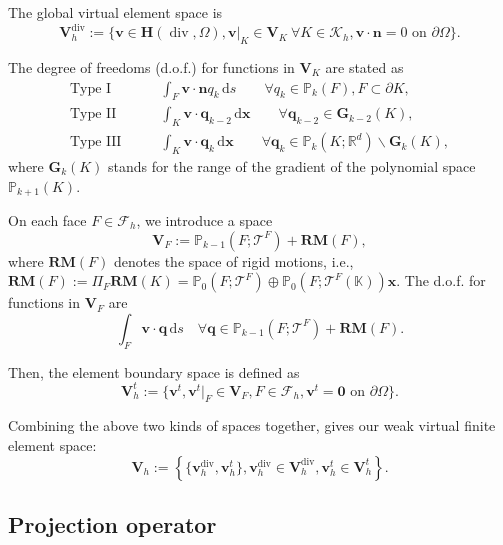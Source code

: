 \documentclass[review,hidelinks,onefignum,onetabnum]{siamart251216}
\begin{document}
The global virtual element space is
\begin{equation*}
\boldsymbol{V}_h^{\operatorname{div}} := \{ \boldsymbol{v} \in \boldsymbol{H}(\operatorname{div}, \Omega), \boldsymbol{v}|_K \in \boldsymbol{V}_K \ \forall K \in \mathcal{K}_h, \boldsymbol{v} \cdot \boldsymbol{n} = 0 \text{ on } \partial \Omega \} .
\end{equation*}


The degree of freedoms (d.o.f.) for functions in \(\boldsymbol{V}_K\) are stated as
\begin{align*}
\text{Type I} \qquad & \int_F \boldsymbol{v} \cdot \boldsymbol{n} q_k \, \mathrm{d}s \qquad \forall q_k \in \mathbb{P}_k(F), F \subset \partial K, \\
\text{Type II} \qquad & \int_K \boldsymbol{v} \cdot \boldsymbol{q}_{k-2} \, \mathrm{d}\boldsymbol{x} \qquad \forall \boldsymbol{q}_{k-2} \in \mathbf{G}_{k-2}(K), \\
\text{Type III} \qquad & \int_K \boldsymbol{v} \cdot \boldsymbol{q}_k \, \mathrm{d}\boldsymbol{x} \qquad \forall \boldsymbol{q}_k \in \mathbb{P}_k(K;\mathbb{R}^d) \backslash \mathbf{G}_k(K),
\end{align*}
where \(\mathbf{G}_k(K)\) stands for the range of the gradient of the polynomial space \(\mathbb{P}_{k+1}(K)\).

On each face \(F \in \mathcal{F}_h\), we introduce a space 
$$
\boldsymbol{V}_F := \mathbb{P}_{k-1}(F;\mathscr T^F) + \mathbf{RM}(F),
$$
 where \(\mathbf{RM}(F)\) denotes the space of rigid motions, i.e., \(\mathbf{RM}(F) :=\Pi_F \mathbf{RM}(K)= \mathbb{P}_0(F; \mathscr T^F) \oplus \mathbb{P}_0(F; \mathscr T^F(\mathbb K)) \boldsymbol{x}\). The d.o.f. for functions in \(\boldsymbol{V}_F\) are
\[
\int_F \boldsymbol{v} \cdot \boldsymbol{q} \, \mathrm{d}s \quad \forall \boldsymbol{q} \in \mathbb{P}_{k-1}(F;\mathscr T^F) + \mathbf{RM}(F).
\]

Then, the element boundary space is defined as
\[
\boldsymbol{V}_h^t := \{ \boldsymbol{v}^t, \boldsymbol{v}^t|_F \in \boldsymbol{V}_F, F \in \mathcal{F}_h, \boldsymbol{v}^t = \boldsymbol{0} \text{ on } \partial \Omega \}.
\]

Combining the above two kinds of spaces together, gives our weak virtual finite element space:
\[
\boldsymbol{V}_h := \left\{ \{ \boldsymbol{v}_h^{\operatorname{div}}, \boldsymbol{v}_h^t \}, \boldsymbol{v}_h^{\operatorname{div}} \in \boldsymbol{V}_h^{\operatorname{div}}, \boldsymbol{v}_h^t \in \boldsymbol{V}_h^t \right\}.
\]

\subsection{Projection operator}
\end{document}
